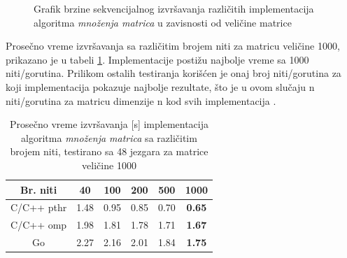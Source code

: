\documentclass[12pt,oneside]{memoir}
\begin{document}
\begin{figure}
\begin{center}


\caption{Grafik brzine sekvencijalnog izvršavanja različitih implementacija algoritma \textit{množenja matrica} u zavisnosti od veličine matrice}
\label{fig:matrix11}
\end{center}
\end{figure}

Prosečno vreme izvršavanja sa različitim brojem niti za matricu veličine 1000, prikazano je u tabeli \ref{tab:matrix5}. Implementacije postižu najbolje vreme sa 1000 niti/gorutina. Prilikom ostalih testiranja korišćen je onaj broj niti/gorutina za koji implementacija pokazuje najbolje rezultate, što je u ovom slučaju n niti/gorutina za matricu dimenzije n kod svih implementacija . 

\begin{table}
\begin{center}
\caption{Prosečno vreme izvršavanja [s] implementacija algoritma \textit{množenja matrica} sa različitim brojem niti, testirano sa 48 jezgara za matrice veličine 1000}
\begin{tabular}{||c||c c c c c||}
\hline
Br. niti		&40&100 &200 &500 &1000\\ \hline
C/C++ pthr	&1.48		&0.95		&0.85		&0.70		&\textbf{0.65} \\ \hline
C/C++ omp	&1.98		&1.81		&1.78		&1.71		&\textbf{1.67} \\ \hline
Go		&2.27		&2.16		&2.01		&1.84		&\textbf{1.75} \\ \hline
\end{tabular}
\label{tab:matrix5}
\end{center}
\end{table}
\end{document}

